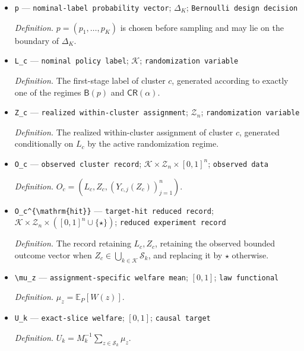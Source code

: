\documentclass{article}
\begin{document}
\begin{itemize}
  \item \texttt{p} --- \texttt{nominal-\allowbreak{}label probability vector}; \(\Delta_K\); \texttt{Bernoulli design decision}
  \par\smallskip\noindent\emph{Definition.} \(p=(p_1,\ldots,p_K)\) is chosen before sampling and may lie on the boundary of \(\Delta_K\).
  \item \texttt{L\_\allowbreak{}c} --- \texttt{nominal policy label}; \(\mathcal K\); \texttt{randomization variable}
  \par\smallskip\noindent\emph{Definition.} The first-stage label of cluster \(c\), generated according to exactly one of the regimes \(\mathsf B(p)\) and \(\mathsf{CR}(\alpha)\).
  \item \texttt{Z\_\allowbreak{}c} --- \texttt{realized within-\allowbreak{}cluster assignment}; \(\mathcal Z_n\); \texttt{randomization variable}
  \par\smallskip\noindent\emph{Definition.} The realized within-cluster assignment of cluster \(c\), generated conditionally on \(L_c\) by the active randomization regime.
  \item \texttt{O\_\allowbreak{}c} --- \texttt{observed cluster record}; \(\mathcal K\times\mathcal Z_n\times[0,1]^n\); \texttt{observed data}
  \par\smallskip\noindent\emph{Definition.} \(O_c=(L_c,Z_c,(Y_{c,j}(Z_c))_{j=1}^n)\).
  \item \texttt{O\_\allowbreak{}c\textasciicircum{}\{\textbackslash{}\allowbreak{}mathrm\{hit\}\allowbreak{}\}\allowbreak{}} --- \texttt{target-\allowbreak{}hit reduced record}; \(\mathcal K\times\mathcal Z_n\times([0,1]^n\cup\{\star\})\); \texttt{reduced experiment record}
  \par\smallskip\noindent\emph{Definition.} The record retaining \(L_c,Z_c\), retaining the observed bounded outcome vector when \(Z_c\in\bigcup_{k\in\mathcal K}\mathcal S_k\), and replacing it by \(\star\) otherwise.
  \item \texttt{\textbackslash{}\allowbreak{}mu\_\allowbreak{}z} --- \texttt{assignment-\allowbreak{}specific welfare mean}; \([0,1]\); \texttt{law functional}
  \par\smallskip\noindent\emph{Definition.} \(\mu_z=\mathbb E_P[W(z)]\).
  \item \texttt{U\_\allowbreak{}k} --- \texttt{exact-\allowbreak{}slice welfare}; \([0,1]\); \texttt{causal target}
  \par\smallskip\noindent\emph{Definition.} \(U_k=M_k^{-1}\sum_{z\in\mathcal S_k}\mu_z\).

\end{itemize}
\end{document}

